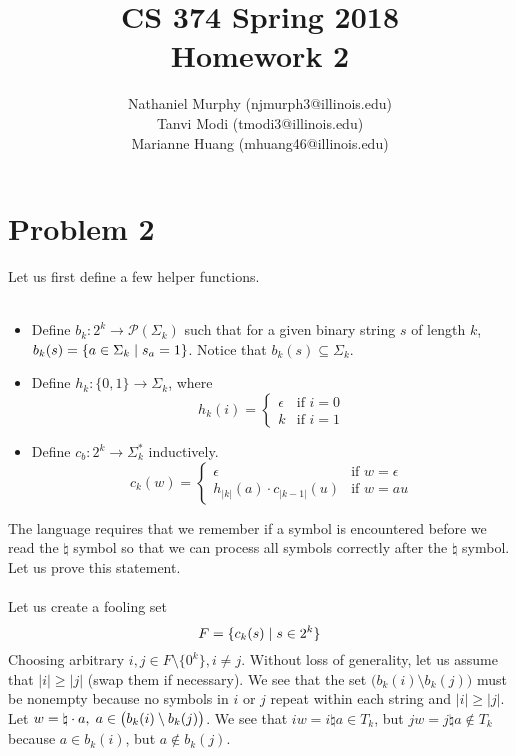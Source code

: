 \documentclass[11pt]{article}
\title{\textbf{CS 374 Spring 2018\\Homework 2}}
\author{Nathaniel Murphy (njmurph3@illinois.edu)\\
		Tanvi Modi (tmodi3@illinois.edu)\\
		Marianne Huang (mhuang46@illinois.edu)}
\date{}
\begin{document}
\maketitle
\section*{Problem 2}
Let us first define a few helper functions. \\
\\
\begin{itemize}
	\item Define $b_k:2^k\rightarrow\mathcal{P}(\Sigma_k)$ such that for a given binary string $s$ of length $k$,\\$b_k(s)=\{a\in\Sigma_k\hspace{1mm}|\hspace{1mm}s_a=1\}$. Notice that $b_k(s)\subseteq\Sigma_k$.
	\item Define $h_k:\{0,1\}\rightarrow\Sigma_k$, where
	\[h_k(i)=\begin{cases}
		\epsilon & \text{if }i=0 \\
		k & \text{if }i=1
	\end{cases}\]
	\item Define $c_b:2^k\rightarrow\Sigma_k^*$ inductively.
	\[c_k(w)=\begin{cases}
		\epsilon & \text{if }w=\epsilon \\
		h_{|k|}(a)\cdot c_{|k-1|}(u) & \text{if }w=au
	\end{cases}\]
\end{itemize}
The language requires that we remember if a symbol is encountered before we read the $\natural$ symbol so that we can process all symbols correctly after the $\natural$ symbol. Let us prove this statement. \\ \\
Let us create a fooling set
\[F=\{c_k(s)\hspace{1mm}|\hspace{1mm}s\in 2^k\}\]
Choosing arbitrary $i,j\in F\setminus\{0^k\},i\neq j$. Without loss of generality, let us assume that $|i|\geq|j|$ (swap them if necessary). We see that the set $\big(b_k(i)\setminus b_k(j)\big)$ must be nonempty because no symbols in $i$ or $j$ repeat within each string and $|i|\geq|j|$. Let $w=\natural\cdot a,\hspace{1mm}a\in\big(b_k(i)\setminus b_k(j)\big)$. We see that $iw=i\natural a\in T_k$, but $jw=j\natural a\notin T_k$ because $a\in b_k(i)$, but $a\notin b_k(j)$. \\ \\
\end{document}
